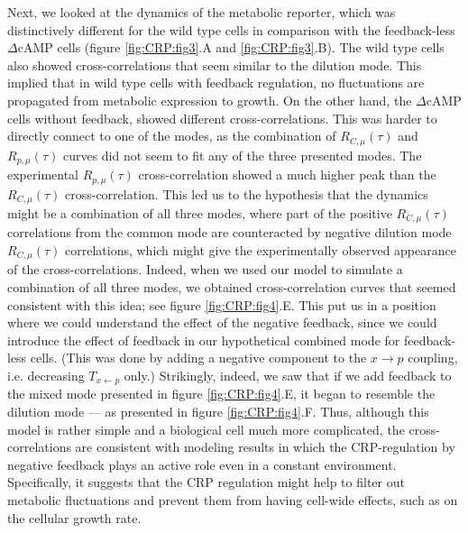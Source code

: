 Next, we looked at the dynamics of the metabolic reporter, which was distinctively different for the wild type cells in comparison with the feedback-less $\Delta$cAMP cells (figure \ref{fig:CRP:fig3}.A and \ref{fig:CRP:fig3}.B).
%
The wild type cells also showed cross-correlations that seem similar to the dilution mode.
This implied that in wild type cells with feedback regulation, no fluctuations are propagated from metabolic expression to growth.
%
On the other hand, the $\Delta$cAMP cells without feedback, showed different cross-correlations.
%
This was harder to directly connect to one of the modes, as the combination of $R_{C,\mu}(\tau)$ and $R_{p,\mu}(\tau)$ curves did not seem to fit any of the three presented modes.
%
The experimental 
$R_{p,\mu}(\tau)$ cross-correlation showed a much higher peak than the $R_{C,\mu}(\tau)$ cross-correlation.
%
This led us to the hypothesis that the dynamics might be a combination of all three modes, where part of the positive $R_{C,\mu}(\tau)$ correlations from the common mode are counteracted by negative dilution mode $R_{C,\mu}(\tau)$ correlations,
which might give the experimentally observed appearance of the cross-correlations.
%
Indeed, when we used our model to simulate a combination of all three modes, we obtained cross-correlation curves that seemed consistent with this idea; see figure \ref{fig:CRP:fig4}.E.
%
This put us in a position where we could understand the effect of the negative feedback,
%
since we could introduce the effect of feedback in our hypothetical combined mode for feedback-less cells.
%
(This was done by adding a negative component to the $x\rightarrow{p}$ coupling, i.e. decreasing $T_{x\leftarrow{p}}$ only.)
%
Strikingly, indeed, we saw that if we add feedback to the mixed mode presented in figure \ref{fig:CRP:fig4}.E, it began to resemble the dilution mode --- as presented in figure \ref{fig:CRP:fig4}.F.
%
Thus, although this model is rather simple and a biological cell much more complicated, %
the cross-correlations are consistent with modeling results 
in which the CRP-regulation by negative feedback plays an active role even in a constant environment.
Specifically, it suggests that the CRP regulation might help to filter out metabolic fluctuations and prevent them from having cell-wide effects, such as on the cellular growth rate.


